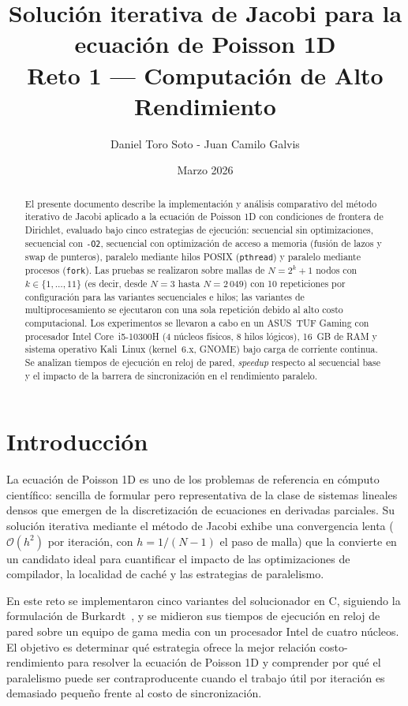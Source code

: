 \documentclass{article}
\title{Solución iterativa de Jacobi para la ecuación de Poisson 1D\\[0.5em]
\large Reto 1 --- Computación de Alto Rendimiento}
\author{Daniel Toro Soto - Juan Camilo Galvis}
\date{Marzo 2026}
\begin{document}
\maketitle


\begin{abstract}
El presente documento describe la implementación y análisis comparativo del
método iterativo de Jacobi aplicado a la ecuación de Poisson 1D con condiciones
de frontera de Dirichlet, evaluado bajo cinco estrategias de ejecución:
secuencial sin optimizaciones, secuencial con \texttt{-O2}, secuencial con
optimización de acceso a memoria (fusión de lazos y swap de punteros), paralelo
mediante hilos POSIX (\texttt{pthread}) y paralelo mediante procesos
(\texttt{fork}).  Las pruebas se realizaron sobre mallas de $N = 2^k + 1$ nodos
con $k \in \{1,\ldots,11\}$ (es decir, desde $N=3$ hasta $N=2\,049$) con 10
repeticiones por configuración para las variantes secuenciales e hilos; las
variantes de multiprocesamiento se ejecutaron con una sola repetición debido al
alto costo computacional.  Los experimentos se llevaron a cabo en un ASUS~TUF
Gaming con procesador Intel Core~i5-10300H (4 núcleos físicos, 8 hilos lógicos),
16~GB de RAM y sistema operativo Kali~Linux (kernel~6.x, GNOME) bajo carga de
corriente continua.  Se analizan tiempos de ejecución en reloj de pared,
\emph{speedup} respecto al secuencial base y el impacto de la barrera de
sincronización en el rendimiento paralelo.
\end{abstract}


\newpage
\tableofcontents
\newpage

\section{Introducción}

La ecuación de Poisson 1D es uno de los problemas de referencia en cómputo
científico: sencilla de formular pero representativa de la clase de sistemas
lineales densos que emergen de la discretización de ecuaciones en derivadas
parciales.  Su solución iterativa mediante el método de Jacobi exhibe una
convergencia lenta ($\mathcal{O}(h^2)$ por iteración, con $h=1/(N-1)$ el paso
de malla) que la convierte en un candidato ideal para cuantificar el impacto de
las optimizaciones de compilador, la localidad de caché y las estrategias de
paralelismo.

En este reto se implementaron cinco variantes del solucionador en C, siguiendo
la formulación de Burkardt~\cite{burkardt}, y se midieron sus tiempos de
ejecución en reloj de pared sobre un equipo de gama media con un procesador
Intel de cuatro núcleos.  El objetivo es determinar qué estrategia ofrece la
mejor relación costo-rendimiento para resolver la ecuación de Poisson 1D y
comprender por qué el paralelismo puede ser contraproducente cuando el trabajo
útil por iteración es demasiado pequeño frente al costo de sincronización.
\end{document}
